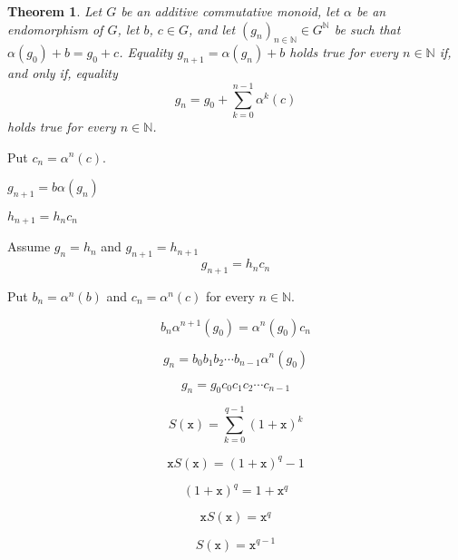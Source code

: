 \documentclass[12pt]{article}
\newcommand{\bZ}{\mathbb{Z}}
\newcommand{\ttx}{\mathtt{x}}
\newcommand{\bN}{\mathbb{N}} %
\newtheorem{theorem}{Theorem}
\theoremstyle{definition}
\begin{document}
\begin{theorem}
  Let $G$ be an additive commutative monoid,
  let $\alpha$ be an endomorphism of $G$,
  let $b$, $c \in G$, and
  let $\left( g_n \right)_{n \in \bN} \in G^\bN$ be such that $\alpha(g_0) + b  = g_0 + c$.
  Equality $g_{n + 1} = \alpha(g_n) + b$ holds true for every $n \in \bN$ if, and only if, 
  equality
  $$g_n = g_0 + \sum_{k = 0}^{n - 1}  \alpha^k(c)
  $$
  holds true for every $n \in \bN$.
\end{theorem}



Put $c_n = \alpha^n(c)$.


$g_{n + 1} = b \alpha(g_n)$

$h_{n + 1} = h_n c_n$

Assume $g_n = h_n$ and $g_{n + 1} = h_{n + 1}$
$$
g_{n + 1} = h_n c_n 
$$


Put $b_n = \alpha^n(b)$ and $c_n = \alpha^n(c)$ for every $n \in \bN$.

$$
b_n \alpha^{n + 1}(g_0) = \alpha^n(g_0) c_n
$$

$$
g_n = b_0 b_1 b_2 \dotsm b_{n - 1}  \alpha^n(g_0)
$$

$$
g_n = g_0 c_0 c_1 c_2 \dotsm c_{n - 1} 
$$





$$
S(\ttx) = \sum_{k = 0}^{q - 1} {(1 + \ttx)}^k 
$$

$$
\ttx S(\ttx) = {(1 + \ttx)}^q - 1
$$

$$
{(1 + \ttx)}^q = 1 + \ttx^q 
$$

$$
\ttx S(\ttx)  = \ttx^q 
$$

$$
S(\ttx)  = \ttx^{q - 1}  
$$
\end{document}
